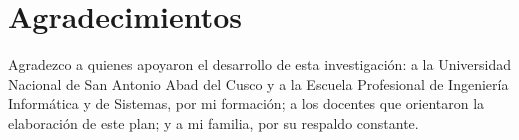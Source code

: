\chapter*{Agradecimientos}

Agradezco a quienes apoyaron el desarrollo de esta investigación: a la Universidad Nacional de San Antonio Abad del Cusco y a la Escuela Profesional de Ingeniería Informática y de Sistemas, por mi formación; a los docentes que orientaron la elaboración de este plan; y a mi familia, por su respaldo constante.

\clearpage
